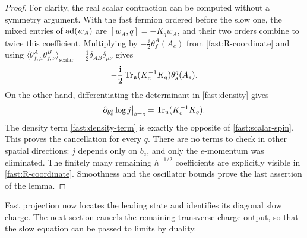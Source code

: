 \begin{proof}
For clarity, the real scalar contraction can be computed without a
symmetry argument. With the fast fermion ordered before the slow
one, the mixed entries of $\operatorname{ad}(w_A)$ are
$[w_A,q]=-K_qw_A$, and their two orders combine to twice this
coefficient. Multiplying by
$-\frac{\ii}{2}\theta_f^A(A_e)$ from
\eqref{fast:R-coordinate} and using
$\langle\theta_{f,\mu}^A\theta_{f,\nu}^B\rangle_{\mathrm{scalar}}
=\frac12\delta_{AB}\delta_{\mu\nu}$ gives
\begin{equation}
 -\frac{\mathrm i}{2}\operatorname{Tr}_{\mathfrak n}(K_e^{-1}K_q)
                                      \theta_s^q(A_e).
 \label{fast:scalar-spin}
\end{equation}
On the other hand, differentiating the determinant in
\eqref{fast:density} gives
\[
 \partial_{b_e^q}\log j\big|_{b=c}
                  =\operatorname{Tr}_{\mathfrak n}(K_e^{-1}K_q).
\]
The density term \eqref{fast:density-term} is exactly the opposite
of \eqref{fast:scalar-spin}. This proves the cancellation for every
$q$. There are no terms to check in other spatial directions:
$j$ depends only on $b_e$, and only the $e$-momentum was eliminated.
The finitely many remaining $h^{-1/2}$ coefficients are explicitly
visible in \eqref{fast:R-coordinate}. Smoothness and the oscillator
bounds prove the last assertion of the lemma.
\end{proof}

Fast projection now locates the leading state and identifies its diagonal
slow charge. The next section cancels the remaining transverse charge
output, so that the slow equation can be passed to limits by duality.
